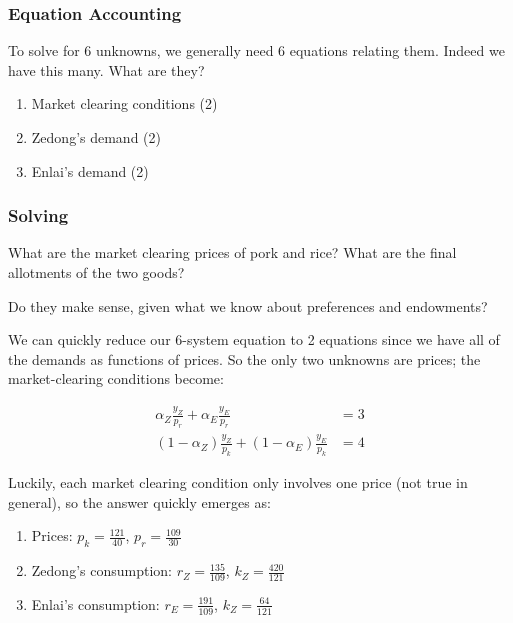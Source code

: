 \documentclass{article}
\newenvironment{solution}{\color{red}}{\color{black}}
\begin{document}
\subsubsection{Equation Accounting}

To solve for 6 unknowns, we generally need 6 equations relating them. Indeed we have this many. What are they?

\begin{solution}
\begin{enumerate}
\item Market clearing conditions (2)
\item Zedong's demand (2)
\item Enlai's demand (2)
\end{enumerate}
\end{solution}

\subsubsection{Solving}

What are the market clearing prices of pork and rice? What are the final allotments of the two goods?

Do they make sense, given what we know about preferences and endowments?

\begin{solution}
We can quickly reduce our 6-system equation to 2 equations since we have all of the demands as functions of prices. So the only two unknowns are prices; the market-clearing conditions become:

\begin{align*}
\alpha_Z \frac{y_Z}{p_r} + \alpha_E \frac{y_E}{p_r} &= 3 \\
(1-\alpha_Z) \frac{y_Z}{p_k} + (1-\alpha_E) \frac{y_E}{p_k} &= 4
\end{align*}

Luckily, each market clearing condition only involves one price (not true in general), so the answer quickly emerges as:

\begin{enumerate}
\item Prices: $p_k = \frac{121}{40}$, $p_r = \frac{109}{30}$
\item Zedong's consumption: $r_Z = \frac{135}{109}$, $k_Z = \frac{420}{121}$
\item Enlai's consumption: $r_E = \frac{191}{109}$, $k_Z = \frac{64}{121}$
\end{enumerate}
\end{solution}
\end{document}
